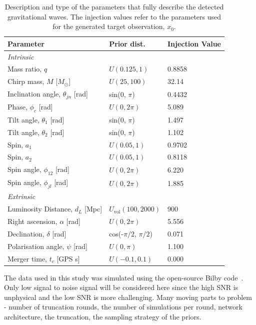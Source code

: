 \begin{table}[htb]
\centering
\caption{Description and type of the parameters that fully describe the detected gravitational waves. The injection values refer to the parameters used for the generated target observation, $x_0$.}
\label{tab:gw_parameters}
\hspace*{-0.5cm}
\begin{tabular}{|l|l|l|} 
\hline
\textbf{Parameter} & \textbf{Prior dist.} & \textbf{Injection Value} \\ 
\hline
\textit{Intrinsic} & & \\ 
Mass ratio, \( q \) & \( U(0.125, 1) \) & 0.8858 \\ 
Chirp mass, \( M \) [\( M_{\odot} \)] & \( U(25, 100) \) & 32.14 \\ 
Inclination angle, \( \theta_{jn} \) [rad] & sin(0, \( \pi \)) & 0.4432 \\ 
Phase, \( \phi_c \) [rad] & \( U(0, 2\pi) \) & 5.089 \\ 
Tilt angle, \( \theta_1 \) [rad] & sin(0, \( \pi \)) & 1.497 \\ 
Tilt angle, \( \theta_2 \) [rad] & sin(0, \( \pi \)) & 1.102 \\ 
Spin, \( a_1 \) & \( U(0.05, 1) \) & 0.9702 \\ 
Spin, \( a_2 \) & \( U(0.05, 1) \) & 0.8118 \\ 
Spin angle, \( \phi_{12} \) [rad] & \( U(0, 2\pi) \) & 6.220 \\ 
Spin angle, \( \phi_{jl} \) [rad] & \( U(0, 2\pi) \) & 1.885 \\ 
\hline
\textit{Extrinsic} & & \\ 
Luminosity Distance, \( d_L \) [Mpc] & \( U_{\text{vol}}(100, 2000) \) & 900 \\ 
Right ascension, \( \alpha \) [rad] & \( U(0, 2\pi) \) & 5.556 \\ 
Declination, \( \delta \) [rad] & cos(-\( \pi/2 \), \( \pi/2 \)) & 0.071 \\ 
Polarisation angle, \( \psi \) [rad] & \( U(0, \pi) \) & 1.100 \\ 
Merger time, \( t_c \) [GPS s] & \( U(-0.1, 0.1) \) & 0.000 \\ 
\hline
\end{tabular}
\end{table}


The data used in this study was simulated using the open-source Bilby code~\cite{Ashton_Bilby_2019}.
Only low signal to noise signal will be considered here since the high SNR is unphysical and the low SNR is more challenging. Many moving parts to problem - number of truncation rounds, the number of simulations per round, network architecture, the truncation, the sampling strategy of the priors.


